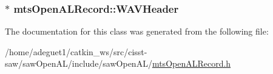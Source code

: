 \hypertarget{classmts_open_a_l_record_ad185524b5a93f8e920b57db367ff01c6}{
\subsubsection[{W\-A\-V\-Header}]{$\ast$ mts\-Open\-A\-L\-Record\-::\-W\-A\-V\-Header\hspace{0.3cm}{\ttfamily [protected]}}}\label{classmts_open_a_l_record_ad185524b5a93f8e920b57db367ff01c6}


The documentation for this class was generated from the following file\-:\begin{DoxyCompactItemize}
\item 
/home/adeguet1/catkin\-\_\-ws/src/cisst-\/saw/saw\-Open\-A\-L/include/saw\-Open\-A\-L/\hyperlink{mts_open_a_l_record_8h}{mts\-Open\-A\-L\-Record.\-h}\end{DoxyCompactItemize}
